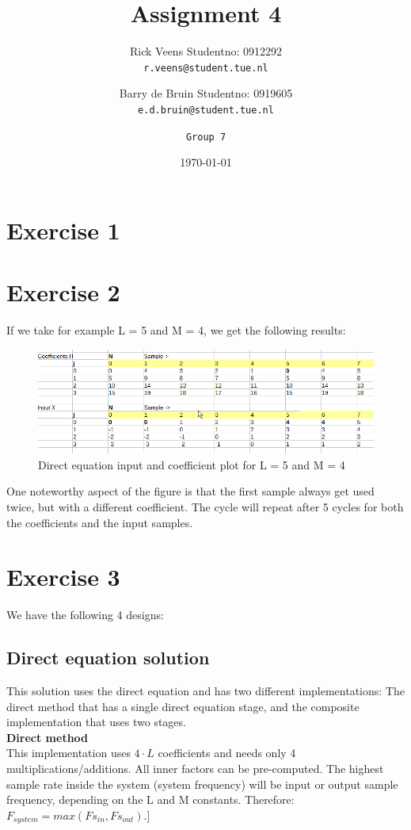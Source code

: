 \documentclass[a4paper,twoside,11pt, fleqn]{article}
\title{\vspace{-\baselineskip}\sffamily\bfseries Assignment 4}
\author{
	Rick Veens \qquad Studentno: 0912292\\
	\texttt{r.veens@student.tue.nl}
	\and
	Barry de Bruin \qquad Studentno: 0919605\\
	\texttt{e.d.bruin@student.tue.nl}
	\and
	\texttt{Group 7}
}
\date{\today}
\begin{document}
\maketitle
\newpage

\tableofcontents

\newpage

\section{Exercise 1}

\newpage
\section{Exercise 2}
If we take for example L = 5 and M = 4, we get the following results:
\begin{figure}[h]
	\includegraphics[scale = 0.8]{Images/repeat}
    \caption{Direct equation input and coefficient plot for L = 5 and M = 4}
\end{figure}

One noteworthy aspect of the figure is that the first sample always get used twice, but with a different coefficient. The cycle will repeat after 5 cycles for both the coefficients and the input samples.

\section{Exercise 3}
We have the following 4 designs: 

\subsection{Direct equation solution}
This solution uses the direct equation and has two different implementations: The direct method that has a single direct equation stage, and the composite implementation that uses two stages.\\

\textbf{Direct method}\\
This implementation uses $4\cdot L$ coefficients and needs only 4 multiplications/additions. All inner factors can be pre-computed.
\smallskip
The highest sample rate inside the system (system frequency) will be input or output sample frequency, depending on the L and M constants. Therefore: $F_{system} = max(Fs_{in}, Fs_{out})$.]\\
 
\end{document}
